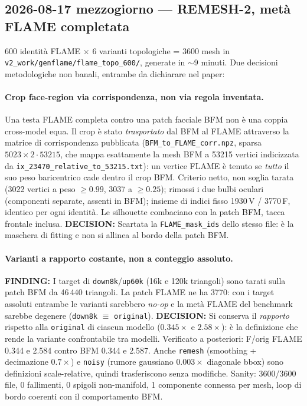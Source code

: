 \documentclass[11pt,a4paper]{article}
\newcommand{\finding}[1]{\textcolor{finding}{\textbf{FINDING:}} #1}
\newcommand{\decision}[1]{\textcolor{decision}{\textbf{DECISION:}} #1}
\begin{document}
\subsection{2026-08-17 mezzogiorno --- REMESH-2, met\`a FLAME completata}

600 identit\`a FLAME $\times$ 6 varianti topologiche = 3600 mesh in
\texttt{v2\_work/genflame/flame\_topo\_600/}, generate in $\sim$9 minuti.
Due decisioni metodologiche non banali, entrambe da dichiarare nel paper:

\paragraph{Crop face-region via corrispondenza, non via regola inventata.}
Una testa FLAME completa contro una patch facciale BFM non \`e una coppia
cross-model equa. Il crop \`e stato \emph{trasportato} dal BFM al FLAME attraverso la
matrice di corrispondenza pubblicata (\texttt{BFM\_to\_FLAME\_corr.npz}, sparsa
$5023 \times 2\cdot 53215$, che mappa esattamente la mesh BFM a 53215 vertici indicizzata
da \texttt{ix\_23470\_relative\_to\_53215.txt}): un vertice FLAME \`e tenuto se \emph{tutto}
il suo peso baricentrico cade dentro il crop BFM. Criterio netto, non soglia tarata
(3022 vertici a peso $\geq 0.99$, 3037 a $\geq 0.25$); rimossi i due bulbi oculari
(componenti separate, assenti in BFM); insieme di indici fisso 1930\,V / 3770\,F,
identico per ogni identit\`a. Le silhouette combaciano con la patch BFM, tacca
frontale inclusa.
\decision{Scartata la \texttt{FLAME\_mask\_ids} dello stesso file: \`e la maschera di
fitting e non si allinea al bordo della patch BFM.}

\paragraph{Varianti a rapporto costante, non a conteggio assoluto.}
\finding{I target di \texttt{down8k}/\texttt{up60k} (16k e 120k triangoli) sono tarati
sulla patch BFM da 46\,440 triangoli. La patch FLAME ne ha 3770: con i target assoluti
entrambe le varianti sarebbero \emph{no-op} e la met\`a FLAME del benchmark sarebbe
degenere (\texttt{down8k} $\equiv$ \texttt{original}).}
\decision{Si conserva il \emph{rapporto} rispetto alla \texttt{original} di ciascun
modello ($0.345\times$ e $2.58\times$): \`e la definizione che rende la variante
confrontabile tra modelli. Verificato a posteriori: F/orig FLAME 0.344 e 2.584 contro
BFM 0.344 e 2.587. Anche \texttt{remesh} (smoothing + decimazione $0.7\times$) e
\texttt{noisy} (rumore gaussiano $0.003\times$ diagonale bbox) sono definizioni
scale-relative, quindi trasferiscono senza modifiche.}
Sanity: 3600/3600 file, 0 fallimenti, 0 spigoli non-manifold, 1 componente connessa
per mesh, loop di bordo coerenti con il comportamento BFM.
\end{document}
